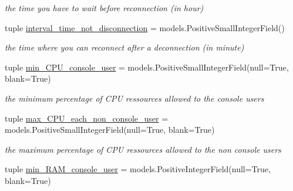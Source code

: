 \begin{DoxyCompactItemize}
\begin{DoxyCompactList}\small\item\em the time you have to wait before reconnection (in hour) \end{DoxyCompactList}\item 
\hypertarget{classrestriction__system_1_1models_1_1Workstation_a3aa3bd1a9c6fb19851c9c0a357596bf7}{}tuple \hyperlink{classrestriction__system_1_1models_1_1Workstation_a3aa3bd1a9c6fb19851c9c0a357596bf7}{interval\+\_\+time\+\_\+not\+\_\+disconnection} = models.\+Positive\+Small\+Integer\+Field()\label{classrestriction__system_1_1models_1_1Workstation_a3aa3bd1a9c6fb19851c9c0a357596bf7}

\begin{DoxyCompactList}\small\item\em the time where you can reconnect after a deconnection (in minute) \end{DoxyCompactList}\item 
\hypertarget{classrestriction__system_1_1models_1_1Workstation_a42c5ec8b203982f7525b7257acd391d5}{}tuple \hyperlink{classrestriction__system_1_1models_1_1Workstation_a42c5ec8b203982f7525b7257acd391d5}{min\+\_\+\+C\+P\+U\+\_\+console\+\_\+user} = models.\+Positive\+Small\+Integer\+Field(null=True, blank=True)\label{classrestriction__system_1_1models_1_1Workstation_a42c5ec8b203982f7525b7257acd391d5}

\begin{DoxyCompactList}\small\item\em the minimum percentage of C\+P\+U ressources allowed to the console users \end{DoxyCompactList}\item 
\hypertarget{classrestriction__system_1_1models_1_1Workstation_a461e79637737047cda1c64e4c4697cb1}{}tuple \hyperlink{classrestriction__system_1_1models_1_1Workstation_a461e79637737047cda1c64e4c4697cb1}{max\+\_\+\+C\+P\+U\+\_\+each\+\_\+non\+\_\+console\+\_\+user} = models.\+Positive\+Small\+Integer\+Field(null=True, blank=True)\label{classrestriction__system_1_1models_1_1Workstation_a461e79637737047cda1c64e4c4697cb1}

\begin{DoxyCompactList}\small\item\em the maximum percentage of C\+P\+U ressources allowed to the non console users \end{DoxyCompactList}\item 
\hypertarget{classrestriction__system_1_1models_1_1Workstation_a6b293e1d3229b3c967c164359e067645}{}tuple \hyperlink{classrestriction__system_1_1models_1_1Workstation_a6b293e1d3229b3c967c164359e067645}{min\+\_\+\+R\+A\+M\+\_\+console\+\_\+user} = models.\+Positive\+Integer\+Field(null=True, blank=True)\label{classrestriction__system_1_1models_1_1Workstation_a6b293e1d3229b3c967c164359e067645}


\end{DoxyCompactItemize}
